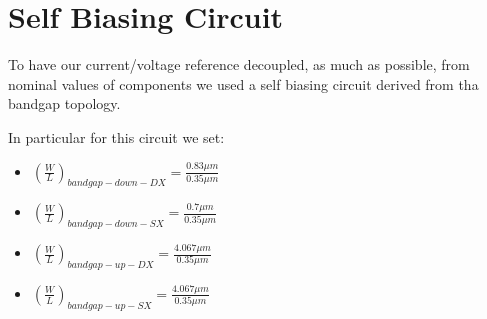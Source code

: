 \chapter{Self Biasing Circuit} %
\label{cha:self_biasing_circuit}

To have our current/voltage reference decoupled, as much as possible, from nominal values of components we used a self biasing circuit derived from tha bandgap topology.

In particular for this circuit we set:

\begin{itemize}

	\item $ (\frac{W}{L})_{bandgap-down-DX} = \frac{0.83\mu m}{0.35 \mu m}$
	
	\item $(\frac{W}{L})_{bandgap-down-SX}= \frac{0.7 \mu m}{0.35 \mu m}$
	
	\item $(\frac{W}{L})_{bandgap-up-DX}= \frac{4.067 \mu m}{0.35 \mu m}$
	
	\item $(\frac{W}{L})_{bandgap-up-SX}= \frac{4.067 \mu m}{0.35 \mu m}$

\end{itemize}


